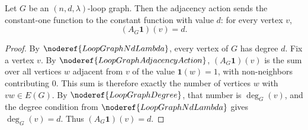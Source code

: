 \begin{helper}
Let \(G\) be an \((n,d,\lambda)\)-loop graph. Then the adjacency action sends the constant-one function to the constant function with value \(d\): for every vertex \(v\),
\[
  (A_G\mathbf 1)(v)=d.
\]
\end{helper}
\begin{proof}
By \(\noderef{LoopGraphNdLambda}\), every vertex of \(G\) has degree \(d\). Fix a vertex \(v\). By \(\noderef{LoopGraphAdjacencyAction}\), \((A_G\mathbf 1)(v)\) is the sum over all vertices \(w\) adjacent from \(v\) of the value \(\mathbf 1(w)=1\), with non-neighbors contributing \(0\). This sum is therefore exactly the number of vertices \(w\) with \(vw\in E(G)\). By \(\noderef{LoopGraphDegree}\), that number is \(\deg_G(v)\), and the degree condition from \(\noderef{LoopGraphNdLambda}\) gives \(\deg_G(v)=d\). Thus \((A_G\mathbf 1)(v)=d\).
\end{proof}
